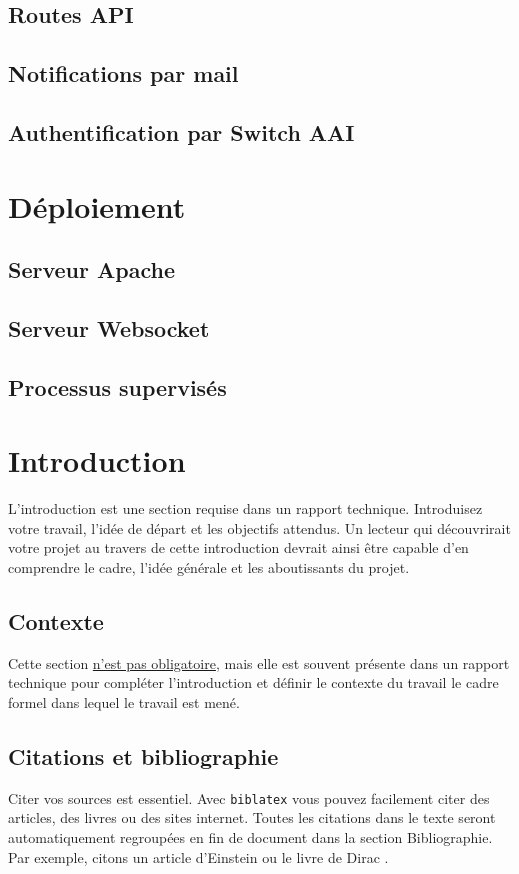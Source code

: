 \documentclass[
    iai, %
    eai, %
]{heig-tb}
\begin{document}
\section{Routes API}
\section{Notifications par mail}
\section{Authentification par Switch AAI}

\chapter{Déploiement}
\section{Serveur Apache}
\section{Serveur Websocket}
\section{Processus supervisés}




\chapter{Introduction}
L'introduction est une section requise dans un rapport technique. Introduisez votre travail, l'idée de départ et les objectifs attendus. Un lecteur qui découvrirait votre projet au travers de cette introduction devrait ainsi être capable d'en comprendre le cadre, l'idée générale et les aboutissants du projet.

\section{Contexte}
Cette section \underline{n'est pas obligatoire}, mais elle est souvent présente dans un rapport technique pour compléter l'introduction et définir le contexte du travail \cad le cadre formel dans lequel le travail est mené.

\section{Citations et bibliographie}
Citer vos sources est essentiel. Avec \texttt{biblatex} vous pouvez facilement citer des articles, des livres ou des sites internet. Toutes les citations dans le texte seront automatiquement regroupées en fin de document dans la section \guillemotleft Bibliographie\guillemotright. Par exemple, citons un article d'Einstein \cite{einstein} ou le livre de Dirac \cite{dirac}.
\end{document}
